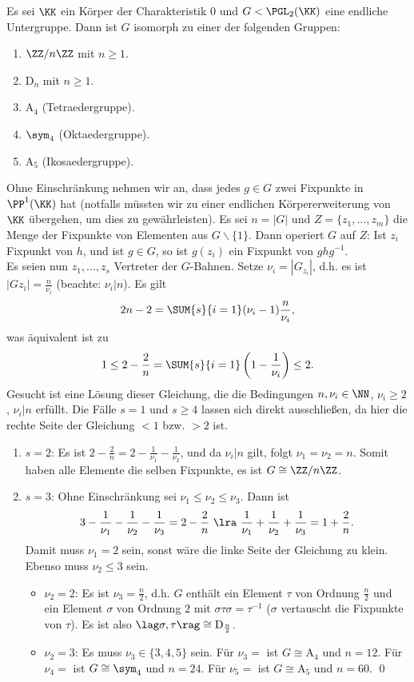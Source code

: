 \SATZ Es sei $\KK$ ein Körper der Charakteristik $0$ und
$G<\PGL_2(\KK)$ eine endliche Untergruppe.
Dann ist $G$ isomorph zu einer der folgenden Gruppen:
\begin{enumerate}
\item $\ZZ/n\ZZ$ mit $n\geq 1$.
\item $\mathrm{D}_n$ mit $n\geq 1$.
\item $\mathrm{A}_4$ (Tetraedergruppe).
\item $\sym_4$ (Oktaedergruppe).
\item $\mathrm{A}_5$ (Ikosaedergruppe).
\end{enumerate}
\bew Ohne Einschränkung nehmen wir an, dass jedes $g\in G$ zwei
Fixpunkte in $\PP^1(\KK)$ hat (notfalls müssten wir zu einer
endlichen Körpererweiterung von $\KK$ übergehen, um dies zu
gewährleisten). Es sei $n=|G|$ und $Z=\{z_1,\ldots,z_m\}$
die Menge der Fixpunkte von Elementen aus $G\backslash\{1\}$.
Dann operiert $G$ auf $Z$: Ist $z_i$ Fixpunkt von $h$, und ist
$g\in G$, so ist $g(z_i)$ ein Fixpunkt von $ghg^{-1}$.\\
Es seien nun $z_1,\ldots,z_s$ Vertreter der $G$-Bahnen.
Setze $\nu_i=|G_{z_i}|$, d.h. es ist $|G z_i|=\frac{n}{\nu_i}$
(beachte: $\nu_i|n$). Es gilt
\[
2n-2 = \SUM{s}{i=1}(\nu_i-1)\frac{n}{\nu_i},
\]
was äquivalent ist zu
\[
1\leq 2-\frac{2}{n} = \SUM{s}{i=1}\left(1-\frac{1}{\nu_i}\right)
\leq 2.
\]
Gesucht ist eine Lösung dieser Gleichung, die die Bedingungen
$n,\nu_i\in\NN$, $\nu_i\geq 2$, $\nu_i|n$ erfüllt.
Die Fälle $s=1$ und $s\geq 4$ lassen sich direkt ausschließen,
da hier die rechte Seite der Gleichung $<1$ bzw. $>2$ ist.
\begin{enumerate}
\item[]$s=2$: Es ist
$2-\frac{2}{n}=2-\frac{1}{\nu_1}-\frac{1}{\nu_2}$, und da $\nu_i|n$
gilt, folgt $\nu_1=\nu_2=n$. Somit haben alle Elemente die selben
Fixpunkte, es ist $G\cong\ZZ/n\ZZ$.
\item[]$s=3$: Ohne Einschränkung sei $\nu_1\leq\nu_2\leq\nu_3$.
Dann ist
\[
3-\frac{1}{\nu_1}-\frac{1}{\nu_2}-\frac{1}{\nu_3}=2-\frac{2}{n}
\ \lra\ 
\frac{1}{\nu_1}+\frac{1}{\nu_2}+\frac{1}{\nu_3}=1+\frac{2}{n}.
\]
Damit muss $\nu_1=2$ sein, sonst wäre die linke Seite der Gleichung
zu klein. Ebenso muss $\nu_2\leq 3$ sein.
\begin{itemize}
\item[]$\nu_2=2$: Es ist $\nu_3=\frac{n}{2}$, d.h. $G$ enthält
ein Element $\tau$ von Ordnung $\frac{n}{2}$ und ein Element
$\sigma$ von Ordnung $2$ mit $\sigma\tau\sigma=\tau^{-1}$
($\sigma$ vertauscht die Fixpunkte von $\tau$).
Es ist also $\lag\sigma,\tau\rag\cong\mathrm{D}_{\frac{n}{2}}$.
\item[] $\nu_2=3$: Es muss $\nu_3\in\{3,4,5\}$ sein.
Für $\nu_3=$ ist $G\cong\mathrm{A}_4$ und $n=12$.
Für $\nu_4=$ ist $G\cong\sym_4$ und $n=24$.
Für $\nu_5=$ ist $G\cong\mathrm{A}_5$ und $n=60$.
\qed
\end{itemize}
\end{enumerate}
